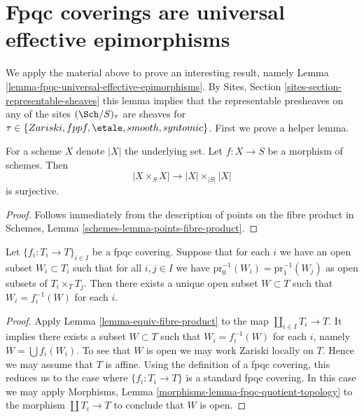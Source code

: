 \section{Fpqc coverings are universal effective epimorphisms}
\label{section-fpqc-universal-effective-epimorphisms}

\noindent
We apply the material above to prove an interesting result, namely
Lemma \ref{lemma-fpqc-universal-effective-epimorphisms}.
By Sites, Section \ref{sites-section-representable-sheaves}
this lemma implies that the representable
presheaves on any of the sites $(\Sch/S)_\tau$ are sheaves for
$\tau \in \{Zariski, fppf, \etale, smooth, syntomic\}$. First
we prove a helper lemma.

\begin{lemma}
\label{lemma-equiv-fibre-product}
For a scheme $X$ denote $|X|$ the underlying set.
Let $f : X \to S$ be a morphism of schemes.
Then
$$
|X \times_S X| \to |X| \times_{|S|} |X|
$$
is surjective.
\end{lemma}

\begin{proof}
Follows immediately from the description of points on the
fibre product in Schemes, Lemma \ref{schemes-lemma-points-fibre-product}.
\end{proof}

\begin{lemma}
\label{lemma-open-fpqc-covering}
Let $\{f_i : T_i \to T\}_{i \in I}$ be a fpqc covering.
Suppose that for each $i$ we have an open subset $W_i \subset T_i$
such that for all $i, j \in I$ we have
$\text{pr}_0^{-1}(W_i) = \text{pr}_1^{-1}(W_j)$ as open
subsets of $T_i \times_T T_j$. Then there exists a unique open subset
$W \subset T$ such that $W_i = f_i^{-1}(W)$ for each $i$.
\end{lemma}

\begin{proof}
Apply
Lemma \ref{lemma-equiv-fibre-product}
to the map $\coprod_{i \in I} T_i \to T$.
It implies there exists a subset $W \subset T$ such that
$W_i = f_i^{-1}(W)$ for each $i$, namely $W = \bigcup f_i(W_i)$.
To see that $W$ is open we may work Zariski locally on $T$.
Hence we may assume that $T$ is affine. Using the definition
of a fpqc covering, this reduces us to the case where
$\{f_i : T_i \to T\}$ is a standard fpqc covering. In this case we
may apply
Morphisms, Lemma \ref{morphisms-lemma-fpqc-quotient-topology}
to the morphism
$\coprod T_i \to T$ to conclude that $W$ is open.
\end{proof}


